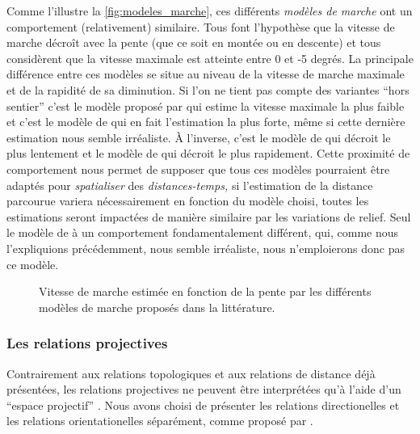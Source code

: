 Comme l'illustre la \autoref{fig:modeles_marche}, ces différents
\emph{modèles de marche} ont un comportement (relativement)
similaire. Tous font l'hypothèse que la vitesse de marche décroît avec
la pente (que ce soit en montée ou en descente) et tous considèrent
que la vitesse maximale est atteinte entre 0 et -5 degrés. La
principale différence entre ces modèles se situe au niveau de la
vitesse de marche maximale et de la rapidité de sa diminution. Si l'on
ne tient pas compte des variantes \enquote{hors sentier} c'est le
modèle proposé par \textcite{Irmischer2017} qui estime la vitesse
maximale la plus faible et c'est le modèle de 
qui en fait l'estimation la plus forte, même si cette dernière
estimation nous semble irréaliste. À l'inverse, c'est le modèle de
\textcite{Irmischer2017} qui décroit le plus lentement et le modèle de
\textcite{Tobler1993} qui décroit le plus rapidement. Cette proximité
de comportement nous permet de supposer que tous ces modèles
pourraient être adaptés pour \emph{spatialiser} des
\emph{distances-temps,} si l'estimation de la distance parcourue
variera nécessairement en fonction du modèle choisi, toutes les
estimations seront impactées de manière similaire par les variations
de relief. Seul le modèle de  à un comportement
fondamentalement différent, qui, comme nous l'expliquions
précédemment, nous semble irréaliste, nous n’emploierons donc pas ce
modèle.

\begin{figure}
  \centering
  
  \caption{Vitesse de marche estimée en fonction de la pente par les
    différents modèles de marche proposés dans la littérature.}
  \label{fig:modeles_marche}
\end{figure}


\subsubsection{Les relations projectives}

Contrairement aux relations topologiques et aux relations de distance
déjà présentées, les relations projectives ne peuvent être
interprétées qu'à l'aide d'un \enquote{espace projectif}
\autocite{Duchene2019}. Nous avons choisi de présenter les relations
directionelles et les relations orientationelles séparément, comme
proposé par \textcite{Duchene2019}.


